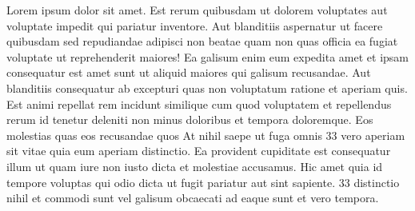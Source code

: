 \documentclass[a4paper,12pt]{report}
\begin{document}
\par Lorem ipsum dolor sit amet. Est rerum quibusdam ut dolorem voluptates aut voluptate impedit qui pariatur inventore. Aut blanditiis aspernatur ut facere quibusdam sed repudiandae adipisci non beatae quam non quas officia ea fugiat voluptate ut reprehenderit maiores! Ea galisum enim eum expedita amet et ipsam consequatur est amet sunt ut aliquid maiores qui galisum recusandae. Aut blanditiis consequatur ab excepturi quas non voluptatum ratione et aperiam quis. Est animi repellat rem incidunt similique cum quod voluptatem et repellendus rerum id tenetur deleniti non minus doloribus et tempora doloremque. Eos molestias quas eos recusandae quos At nihil saepe ut fuga omnis 33 vero aperiam sit vitae quia eum aperiam distinctio. Ea provident cupiditate est consequatur illum ut quam iure non iusto dicta et molestiae accusamus. Hic amet quia id tempore voluptas qui odio dicta ut fugit pariatur aut sint sapiente. 33 distinctio nihil et commodi sunt vel galisum obcaecati ad eaque sunt et vero tempora. 
\end{document}
